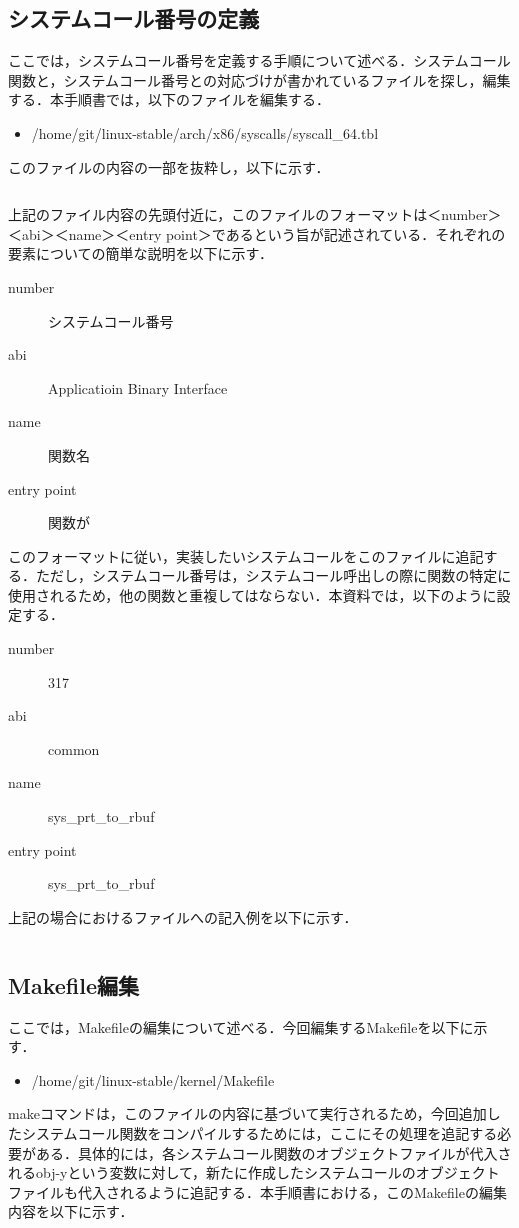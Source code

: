 \documentclass[12pt]{jsarticle}
\begin{document}
\subsection{システムコール番号の定義}
ここでは，システムコール番号を定義する手順について述べる．システムコール関数と，システムコール番号との対応づけが書かれているファイルを探し，編集する．本手順書では，以下のファイルを編集する．
\begin{itemize}
\item \slash{}home\slash{}git\slash{}linux-stable\slash{}arch\slash{}x86\slash{}syscalls\slash{}syscall\_64.tbl
\end{itemize}
このファイルの内容の一部を抜粋し，以下に示す．
\begin{verbatim}
\end{verbatim}
上記のファイル内容の先頭付近に，このファイルのフォーマットは＜number＞＜abi＞＜name＞＜entry point＞であるという旨が記述されている．それぞれの要素についての簡単な説明を以下に示す．
\begin{description}
\item[number] システムコール番号
\item[abi] Applicatioin Binary Interface
\item[name] 関数名
\item[entry point] 関数が 
\end{description}
このフォーマットに従い，実装したいシステムコールをこのファイルに追記する．ただし，システムコール番号は，システムコール呼出しの際に関数の特定に使用されるため，他の関数と重複してはならない．本資料では，以下のように設定する．
\begin{description}
\item[number] 317
\item[abi] common
\item[name] sys\_prt\_to\_rbuf
\item[entry point] sys\_prt\_to\_rbuf 
\end{description}
上記の場合におけるファイルへの記入例を以下に示す．
\begin{verbatim}
\end{verbatim}
\subsection{Makefile編集}
ここでは，Makefileの編集について述べる．今回編集するMakefileを以下に示す．
\begin{itemize}
\item \slash{}home\slash{}git\slash{}linux-stable\slash{}kernel\slash{}Makefile
\end{itemize}
makeコマンドは，このファイルの内容に基づいて実行されるため，今回追加したシステムコール関数をコンパイルするためには，ここにその処理を追記する必要がある．具体的には，各システムコール関数のオブジェクトファイルが代入されるobj-yという変数に対して，新たに作成したシステムコールのオブジェクトファイルも代入されるように追記する．本手順書における，このMakefileの編集内容を以下に示す．
\end{document}
